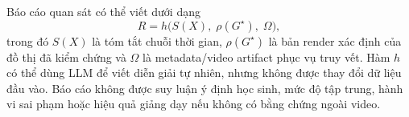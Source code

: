 Báo cáo quan sát có thể viết dưới dạng
\begin{equation}
\label{eq:report-generation}
    R = h\big(S(X),\; \rho(G^\star),\; \Omega\big),
\end{equation}
trong đó \(S(X)\) là tóm tắt chuỗi thời gian, \(\rho(G^\star)\) là bản render xác định của đồ thị đã kiểm chứng và \(\Omega\) là metadata/video artifact phục vụ truy vết. Hàm \(h\) có thể dùng LLM để viết diễn giải tự nhiên, nhưng không được thay đổi dữ liệu đầu vào. Báo cáo không được suy luận ý định học sinh, mức độ tập trung, hành vi sai phạm hoặc hiệu quả giảng dạy nếu không có bằng chứng ngoài video.